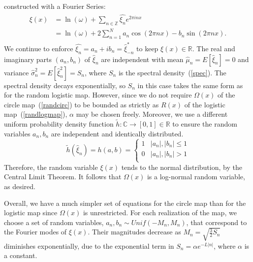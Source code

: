 constructed with a Fourier Series:
\begin{align}\label{fs_circ}
\begin{split}
\xi(x) &= \ln(\omega) + \sum_{n \in \mathbb{Z}}\hat{\xi_n}e^{2\pi inx}\\
&= \ln(\omega) + 2\sum^N_{n=1}a_n\cos(2\pi nx)-b_n\sin(2\pi nx).
\end{split}
\end{align}
We continue to enforce $\hat{\xi_n} = a_n + ib_n = \hat{\xi}_{-n}^*$
to keep $\xi(x) \in \mathbb{R}$. The real and imaginary parts
$(a_n,b_n)$ of $\hat{\xi}_n$ are independent with mean
$\hat{\mu}_n=E[\hat{\xi}_n]=0$ and variance $\hat{\sigma}_n^2=E[\hat{\xi}_n^2]=S_n$,
where $S_n$ is the spectral density~(\ref{spec}). The
spectral density decays exponentially, so $S_n$ in this case
takes the same form as for the random logistic map. However, since we
do not require $\Omega(x)$ of the circle map~(\ref{randcirc}) to be bounded as strictly
as $R(x)$ of the logistic map~(\ref{randlogmap}), $\alpha$ may be
chosen freely. Moreover, we use a different uniform probability density
function $\tilde{h}:\mathbb{C}\to [0,1]\in \mathbb{R}$ to ensure the
random variables $a_n,b_n$ are independent and identically distributed. 
\begin{equation}\label{eq:circh}
   \tilde{h}(\hat{\xi}_n) =h(a,b)= \left\{
     \begin{array}{lr}
       1 & |a_n|,|b_n| \leq 1\\
       0 & |a_n|,|b_n| > 1\\
     \end{array}
   \right.
\end{equation} 
Therefore, the random
variable $\xi(x)$ tends to the normal distribution, by the Central
Limit Theorem. It follows that $\Omega(x)$ is a log-normal random
variable, as desired. 

Overall, we have a much simpler set of equations for the circle map
than for the logistic map since $\Omega(x)$ is unrestricted. For each realization of the map, we choose
a set of random variables, $a_n, b_n \sim Unif(-M_n,M_n)$, that
correspond to the Fourier modes of $\xi(x)$. Their magnitudes decrease
as $M_n=\sqrt{\frac{3}{2}S_n}$ diminishes exponentially, due to the
exponential term in $S_n=\alpha e^{-L|n|}$, where $\alpha$ is a constant. 